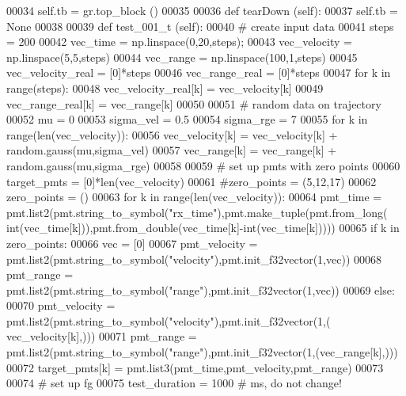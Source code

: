 \begin{DoxyCode}
00034         self.tb = gr.top\_block ()
00035 
00036     \textcolor{keyword}{def }tearDown (self):
00037         self.tb = \textcolor{keywordtype}{None}
00038 
00039     \textcolor{keyword}{def }test_001_t (self):
00040         \textcolor{comment}{# create input data}
00041         steps = 200
00042         vec\_time = np.linspace(0,20,steps);
00043         vec\_velocity = np.linspace(5,5,steps)
00044         vec\_range = np.linspace(100,1,steps)
00045         vec\_velocity\_real = [0]*steps
00046         vec\_range\_real = [0]*steps
00047         \textcolor{keywordflow}{for} k \textcolor{keywordflow}{in} range(steps):
00048             vec\_velocity\_real[k] = vec\_velocity[k]
00049             vec\_range\_real[k] = vec\_range[k]
00050         
00051         \textcolor{comment}{# random data on trajectory}
00052         mu = 0
00053         sigma\_vel = 0.5
00054         sigma\_rge = 7
00055         \textcolor{keywordflow}{for} k \textcolor{keywordflow}{in} range(len(vec\_velocity)):
00056             vec\_velocity[k] = vec\_velocity[k] + random.gauss(mu,sigma\_vel)
00057             vec\_range[k] = vec\_range[k] + random.gauss(mu,sigma\_rge)
00058         
00059         \textcolor{comment}{# set up pmts with zero points}
00060         target\_pmts = [0]*len(vec\_velocity)
00061         \textcolor{comment}{#zero\_points = (5,12,17)}
00062         zero\_points = ()
00063         \textcolor{keywordflow}{for} k \textcolor{keywordflow}{in} range(len(vec\_velocity)):
00064             pmt\_time = pmt.list2(pmt.string\_to\_symbol(\textcolor{stringliteral}{"rx\_time"}),pmt.make\_tuple(pmt.from\_long(
      int(vec\_time[k])),pmt.from\_double(vec\_time[k]-int(vec\_time[k]))))
00065             \textcolor{keywordflow}{if} k \textcolor{keywordflow}{in} zero\_points:
00066                 vec = [0]
00067                 pmt\_velocity = pmt.list2(pmt.string\_to\_symbol(\textcolor{stringliteral}{"velocity"}),pmt.init\_f32vector(1,vec))
00068                 pmt\_range = pmt.list2(pmt.string\_to\_symbol(\textcolor{stringliteral}{"range"}),pmt.init\_f32vector(1,vec))
00069             \textcolor{keywordflow}{else}:
00070                 pmt\_velocity = pmt.list2(pmt.string\_to\_symbol(\textcolor{stringliteral}{"velocity"}),pmt.init\_f32vector(1,(
      vec\_velocity[k],)))
00071                 pmt\_range = pmt.list2(pmt.string\_to\_symbol(\textcolor{stringliteral}{"range"}),pmt.init\_f32vector(1,(vec\_range[k],)))
00072             target\_pmts[k] = pmt.list3(pmt\_time,pmt\_velocity,pmt\_range)
00073         
00074         \textcolor{comment}{# set up fg}
00075         test\_duration = 1000 \textcolor{comment}{# ms, do not change!}

\end{DoxyCode}

